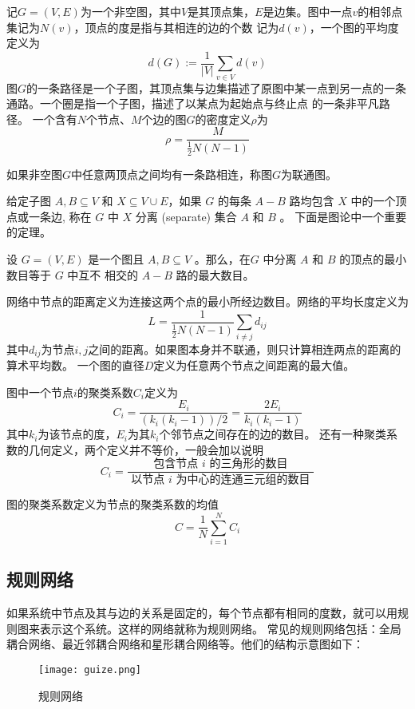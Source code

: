 记$G=(V,E)$为一个非空图，其中$V$是其顶点集，$E$是边集。图中一点$v$的相邻点集记为$N(v)$，顶点的度是指与其相连的边的个数
记为$d(v)$，一个图的平均度定义为
\begin{equation}
    d(G):=\frac{1}{|V|} \sum_{v \in V} d(v)
\end{equation}
图$G$的一条路径是一个子图，其顶点集与边集描述了原图中某一点到另一点的一条通路。一个圈是指一个子图，描述了以某点为起始点与终止点
的一条非平凡路径。
一个含有$N$个节点、$M$个边的图$G$的密度定义$\rho$为
\begin{equation}
    \rho=\frac{M}{\frac{1}{2} N(N-1)}
\end{equation}
\begin{definition}
    如果非空图$G$中任意两顶点之间均有一条路相连，称图$G$为联通图。
\end{definition}
给定子图 $A,B \subseteq V$ 和 $X \subseteq V \cup E$，如果 $G$ 的每条 $A-B$ 路均包含 $X$ 中的一个顶点或一条边,
称在 $G$ 中 $X$ 分离 (separate) 集合 $A$ 和 $B$ 。
下面是图论中一个重要的定理。
\begin{theorem}
    设 $G=(V,E)$ 是一个图且 $A,B \subseteq V$ 。那么，在$G$ 中分离 $A$ 和 $B$ 的顶点的最小数目等于 $G$ 中互不
    相交的 $A-B$ 路的最大数目。
\end{theorem}
网络中节点的距离定义为连接这两个点的最小所经边数目。网络的平均长度定义为
\begin{equation}
    L=\frac{1}{\frac{1}{2} N(N-1)} \sum_{i \neq j} d_{i j}
\end{equation}
其中$d_{ij}$为节点$i,j$之间的距离。如果图本身并不联通，则只计算相连两点的距离的算术平均数。
一个图的直径$D$定义为任意两个节点之间距离的最大值。
\begin{definition}
    图中一个节点$i$的聚类系数$C_i$定义为
\begin{equation}
    C_i=\frac{E_i}{\left(k_i\left(k_i-1\right)\right) / 2}=\frac{2 E_i}{k_i\left(k_i-1\right)}
\end{equation}
其中$k_i$为该节点的度，$E_i$为其$k_i$个邻节点之间存在的边的数目。
还有一种聚类系数的几何定义，两个定义并不等价，一般会加以说明
\begin{equation}
    C_i=\frac{\text { 包含节点 } i \text { 的三角形的数目 }}{\text { 以节点 } i \text { 为中心的连通三元组的数目 }}
\end{equation}
\end{definition}
图的聚类系数定义为节点的聚类系数的均值
\begin{equation}
    C=\frac{1}{N} \sum_{i=1}^N C_i
\end{equation}
\subsection{规则网络}
如果系统中节点及其与边的关系是固定的，每个节点都有相同的度数，就可以用规则图来表示这个系统。这样的网络就称为规则网络。
常见的规则网络包括：全局耦合网络、最近邻耦合网络和星形耦合网络等。他们的结构示意图如下：
\begin{figure}[!htbp]
    \centering
    \texttt{[image: guize.png]}
    \caption{规则网络}
\end{figure}


